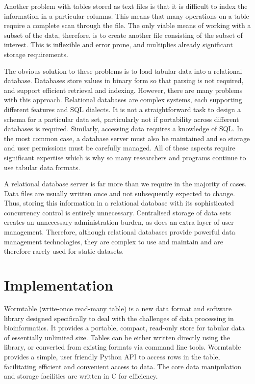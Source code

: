 \documentclass[10pt]{bmc_article}
\newenvironment{bmcformat}{\begin{raggedright}\baselineskip20pt\sloppy\setboolean{publ}{false}}{\end{raggedright}\baselineskip20pt\sloppy}
\begin{document}
\begin{bmcformat}
Another problem with tables stored as text files is that it is difficult 
to index the information in a particular columns. 
This means that many operations on a table require a complete scan 
through the file. The only viable means of 
working with a subset of the data, therefore, 
is to create another file consisting of the subset of interest. 
This is inflexible and error prone, and multiplies already significant  
storage requirements.

The obvious solution to these problems is to load tabular data into a
relational database. Databases store values in binary form so that parsing is 
not required, and support efficient retrieval and indexing. However, there 
are many problems with this approach. Relational databases are 
complex systems, each supporting different features and SQL 
dialects. It is not a straightforward task to design a schema for a 
particular data set, particularly not if portability across different 
databases is required. Similarly, accessing data requires a knowledge
of SQL. In the most common case, a database server must also be maintained
and so storage and user permissions must be carefully managed. All of 
these aspects require significant expertise which is why so many researchers 
and programs continue to use tabular data formats.

A relational database server is far more than we require in the 
majority of cases. Data files are usually written once and 
not subsequently expected to change.
Thus, storing this information 
in a relational database with its sophisticated concurrency control
is entirely unnecessary. Centralised storage of data sets
creates an unnecessary administration burden, as does an extra
layer of user management. Therefore, although relational databases
provide powerful data management technologies, they are complex
to use and maintain and are therefore rarely used for 
static datasets.

\section*{Implementation}

Wormtable (write-once read-many table) 
is a new data format and software library designed specifically
to deal with the challenges of data processing in bioinformatics.
It provides a portable, compact, read-only store for tabular
data of essentially unlimited size. Tables can
be either written directly using the library, or converted
from existing formats via command line tools. 
Wormtable provides a simple, user friendly Python API to access rows
in the table, facilitating efficient and convenient access to 
data. The core data manipulation and storage facilities 
are written in C for efficiency.


\end{bmcformat}
\end{document}
